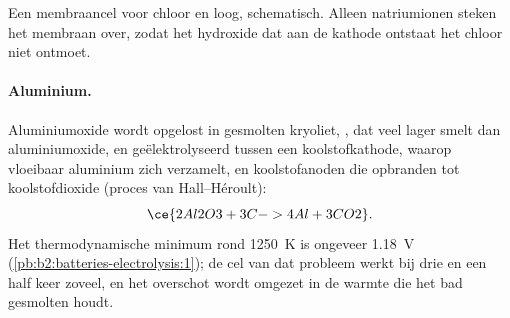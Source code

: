 \begin{omfigure}

{\small Een membraancel voor chloor en loog, schematisch. Alleen natriumionen steken het
membraan over, zodat het hydroxide dat aan de kathode ontstaat het chloor niet ontmoet.}
\end{omfigure}

\paragraph{Aluminium.} Aluminiumoxide wordt opgelost in gesmolten kryoliet,
, dat veel lager smelt dan aluminiumoxide, en geëlektrolyseerd tussen een
koolstofkathode, waarop vloeibaar aluminium zich verzamelt, en koolstofanoden die
opbranden tot koolstofdioxide (proces van Hall--Héroult):
\[
  \ce{2Al2O3 + 3C -> 4Al + 3CO2} .
\]
Het thermodynamische minimum rond \qty{1250}{K} is ongeveer \qty{1.18}{V}
(\cref{pb:b2:batteries-electrolysis:1}); de cel van dat probleem werkt bij drie
en een half keer zoveel, en het overschot wordt omgezet in de warmte die het bad
gesmolten houdt.

